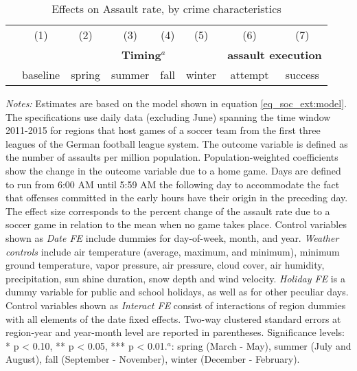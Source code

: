 \documentclass[11pt, a4paper]{article} %
\begin{document}
\begin{landscape}
	\vspace*{\fill}
	\begin{table}[H] \centering 
		\begin{threeparttable} \centering \caption{Effects on Assault rate, by crime characteristics}
			\label{tab_soc_ext:reg_fe_assrate_crime_chars}
			{\def\sym#1{\ifmmode^{#1}\else\(^{#1}\)\fi} 
				\begin{tabular}{l*{7}{c}}
					\toprule 
					&\multicolumn{1}{c}{(1)}&\multicolumn{1}{c}{(2)}&\multicolumn{1}{c}{(3)}&\multicolumn{1}{c}{(4)}&\multicolumn{1}{c}{(5)}&\multicolumn{1}{c}{(6)} &\multicolumn{1}{c}{(7)}\\
					& & \multicolumn{4}{c}{\textbf{Timing}$^a$} & \multicolumn{2}{c}{\textbf{assault execution}} \\
					\cmidrule(lr){3-6} \cmidrule(lr){7-8}
					& baseline & spring & summer & fall & winter & attempt & success \\
					\midrule
					 
					\bottomrule 
			\end{tabular}}
			\begin{tablenotes} 
				\item \scriptsize \emph{Notes:} Estimates are based on the model shown in equation \ref{eq_soc_ext:model}. The specifications use daily data (excluding June) spanning the time window 2011-2015 for regions that host games of a soccer team from the first three leagues of the German football league system. The outcome variable is defined as the number of assaults per million population. Population-weighted coefficients show the change in the outcome variable due to a home game. Days are defined to run from 6:00 AM until 5:59 AM the following day to accommodate the fact that offenses committed in the early hours have their origin in the preceding day. The effect size corresponds to the percent change of the assault rate due to a soccer game in relation to the mean when no game takes place. Control variables shown as \textit{Date FE} include dummies for day-of-week, month, and year. \textit{Weather controls} include air temperature (average, maximum, and minimum), minimum ground temperature, vapor pressure, air pressure, cloud cover, air humidity, precipitation, sun shine duration, snow depth and wind velocity. \textit{Holiday FE} is a dummy variable for public and school holidays, as well as for other peculiar days. Control variables shown as \textit{Interact FE} consist of interactions of region dummies with all elements of the date fixed effects. Two-way clustered standard errors at region-year and year-month level are reported in parentheses. \newline Significance levels: * p < 0.10, ** p < 0.05, *** p < 0.01.\newline \hspace*{10pt}$^a$: spring (March - May), summer (July and August), fall (September - November), winter (December - February).

\end{tablenotes}
\end{threeparttable}
\end{table}
\end{landscape}
\end{document}

